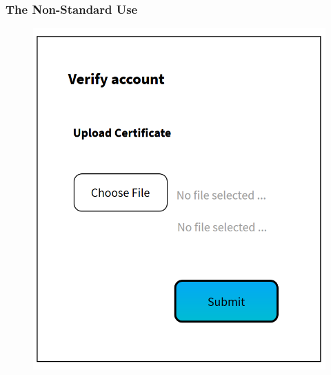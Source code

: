 \subsubsection{The Non-Standard Use}

\begin{minipage}{0.5\textwidth}
\begin{figure}[H]
\centering
\includegraphics[scale=.6]{SystemSpec/Usecases/Mocks/reqVerNon02.png}\\

\end{figure}
\end{minipage}
